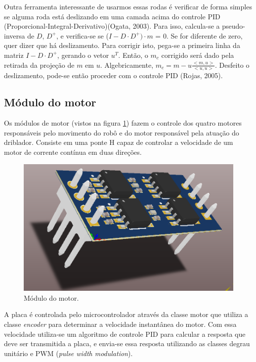 \documentclass[conference]{IEEEtran}
\begin{document}
Outra ferramenta interessante de usarmos essas rodas é verificar de forma simples se alguma roda está deslizando em uma camada acima do controle PID (Proporcional-Integral-Derivativo)(Ogata, 2003)\cite{ogata-pid}. Para isso, calcula-se a pseudo-inversa de $D$, $D^+$, e verifica-se se ($I-D\cdot D^+)\cdot m$ = 0. Se for diferente de zero, quer dizer que há deslizamento. Para corrigir isto, pega-se a primeira linha da matriz $I-D\cdot D^+$, gerando o vetor $u^T$. Então, o $m_c$ corrigido será dado pela retirada da projeção de $m$ em $u$. Algebricamente, $m_c = m - u\displaystyle\frac{<m,u>}{<u,u>}$. Desfeito o deslizamento, pode-se então proceder com o controle PID (Rojas, 2005)\cite{omni}.

\subsection{Módulo do motor}

Os módulos de motor (vistos na figura \ref{img:modulomotor}) fazem o controle dos quatro motores responsáveis pelo movimento do robô e do motor responsável pela atuação do driblador. Consiste em uma ponte H capaz de controlar a velocidade de um motor de corrente contínua em duas direções. 

\begin{figure}[thpb]	
	\centering
	\includegraphics[width=\linewidth]{img/modulomotor}
	\caption{Módulo do motor.}
	\label{img:modulomotor}
\end{figure}

A placa é controlada pelo microcontrolador através da classe motor que utiliza a classe \textit{encoder} para determinar a velocidade instantânea do motor. Com essa velocidade utiliza-se um algoritmo de controle PID para calcular a resposta que deve ser transmitida a placa, e envia-se essa resposta utilizando as classes degrau unitário e PWM (\textit{pulse width modulation}).
\end{document}
